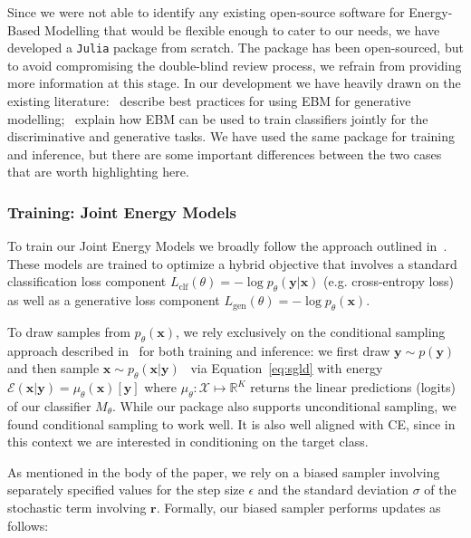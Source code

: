 \documentclass{article}
\begin{document}
Since we were not able to identify any existing open-source software for Energy-Based Modelling that would be flexible enough to cater to our needs, we have developed a \texttt{Julia} package from scratch. The package has been open-sourced, but to avoid compromising the double-blind review process, we refrain from providing more information at this stage. In our development we have heavily drawn on the existing literature:~\citet{du2020implicit} describe best practices for using EBM for generative modelling;~\citet{grathwohl2020your} explain how EBM can be used to train classifiers jointly for the discriminative and generative tasks. We have used the same package for training and inference, but there are some important differences between the two cases that are worth highlighting here.

\subsubsection{Training: Joint Energy Models}

To train our Joint Energy Models we broadly follow the approach outlined in~\citet{grathwohl2020your}. These models are trained to optimize a hybrid objective that involves a standard classification loss component $L_{\text{clf}}(\theta)=-\log p_{\theta}(\mathbf{y}|\mathbf{x})$ (e.g. cross-entropy loss) as well as a generative loss component $L_{\text{gen}}(\theta)=-\log p_{\theta}(\mathbf{x})$. 

To draw samples from $p_{\theta}(\mathbf{x})$, we rely exclusively on the conditional sampling approach described in~\citet{grathwohl2020your} for both training and inference: we first draw $\mathbf{y}\sim p(\mathbf{y})$ and then sample $\mathbf{x} \sim p_{\theta}(\mathbf{x}|\mathbf{y})$~\citep{grathwohl2020your} via Equation~\ref{eq:sgld} with energy $\mathcal{E}(\mathbf{x}|\mathbf{y})=\mu_{\theta}(\mathbf{x})[\mathbf{y}]$ where $\mu_{\theta}: \mathcal{X} \mapsto \mathbb{R}^K$ returns the linear predictions (logits) of our classifier $M_{\theta}$. While our package also supports unconditional sampling, we found conditional sampling to work well. It is also well aligned with CE, since in this context we are interested in conditioning on the target class. 

As mentioned in the body of the paper, we rely on a biased sampler involving separately specified values for the step size $\epsilon$ and the standard deviation $\sigma$ of the stochastic term involving $\mathbf{r}$. Formally, our biased sampler performs updates as follows: 
\end{document}

